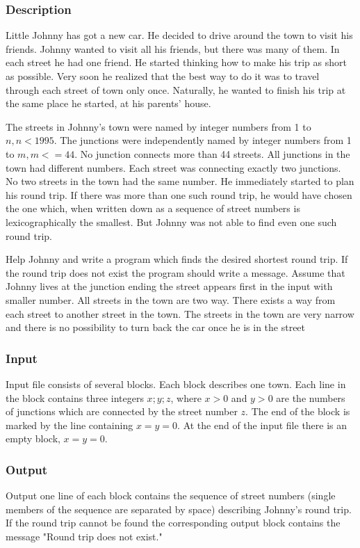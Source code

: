 \subsubsection{Description}
Little Johnny has got a new car. He decided to drive around the town to visit his friends. Johnny wanted to visit all his friends, but there was many of them. In each street he had one friend. He started thinking how to make his trip as short as possible. Very soon he realized that the best way to do it was to travel through each street of town only once. Naturally, he wanted to finish his trip at the same place he started, at his parents' house. 

The streets in Johnny's town were named by integer numbers from 1 to $n, n < 1995$. The junctions were independently named by integer numbers from 1 to $m, m <= 44$. No junction connects more than 44 streets. All junctions in the town had different numbers. Each street was connecting exactly two junctions. No two streets in the town had the same number. He immediately started to plan his round trip. If there was more than one such round trip, he would have chosen the one which, when written down as a sequence of street numbers is lexicographically the smallest. But Johnny was not able to find even one such round trip. 

Help Johnny and write a program which finds the desired shortest round trip. If the round trip does not exist the program should write a message. Assume that Johnny lives at the junction ending the street appears first in the input with smaller number. All streets in the town are two way. There exists a way from each street to another street in the town. The streets in the town are very narrow and there is no possibility to turn back the car once he is in the street 


\subsubsection{Input}
Input file consists of several blocks. Each block describes one town. Each line in the block contains three integers $x; y; z$, where $x > 0$ and $y > 0$ are the numbers of junctions which are connected by the street number $z$. The end of the block is marked by the line containing $x = y = 0$. At the end of the input file there is an empty block, $x = y = 0$.


\subsubsection{Output}
Output one line of each block contains the sequence of street numbers (single members of the sequence are separated by space) describing Johnny's round trip. If the round trip cannot be found the corresponding output block contains the message "Round trip does not exist."


